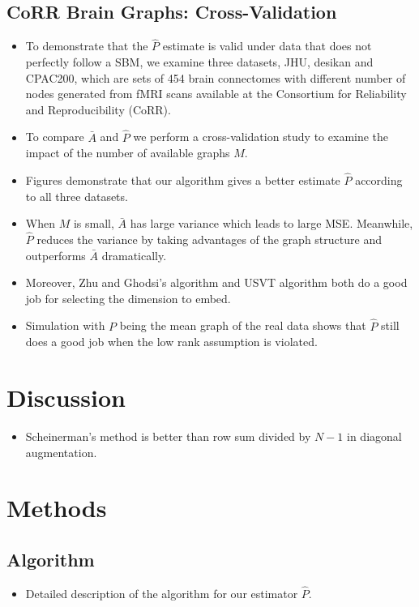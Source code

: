 \documentclass[a4paper]{article}
\begin{document}
\subsection{CoRR Brain Graphs: Cross-Validation}
\begin{itemize}
\item To demonstrate that the $\hat{P}$ estimate is valid under data that does not perfectly follow a SBM, we examine three datasets, JHU, desikan and CPAC200, which are sets of 454 brain connectomes with different number of nodes generated from fMRI scans available at the Consortium for Reliability and Reproducibility (CoRR).
\item To compare $\bar{A}$ and $\hat{P}$ we perform a cross-validation study to examine the impact of the number of available graphs $M$.
\item Figures demonstrate that our algorithm gives a better estimate $\hat{P}$ according to all three datasets. 
\item When $M$ is small, $\bar{A}$ has large variance which leads to large MSE. Meanwhile, $\hat{P}$ reduces the variance by taking advantages of the graph structure and outperforms $\bar{A}$ dramatically.
\item Moreover, Zhu and Ghodsi's algorithm and USVT algorithm both do a good job for selecting the dimension to embed.
\item Simulation with $P$ being the mean graph of the real data shows that $\hat{P}$ still does a good job when the low rank assumption is violated.
\end{itemize}




\section{Discussion}
\begin{itemize}
\item Scheinerman's method is better than row sum divided by $N-1$ in diagonal augmentation.
\end{itemize}






\section{Methods}

\subsection{Algorithm}
\begin{itemize}
\item Detailed description of the algorithm for our estimator $\hat{P}$.
\end{itemize}
\end{document}
